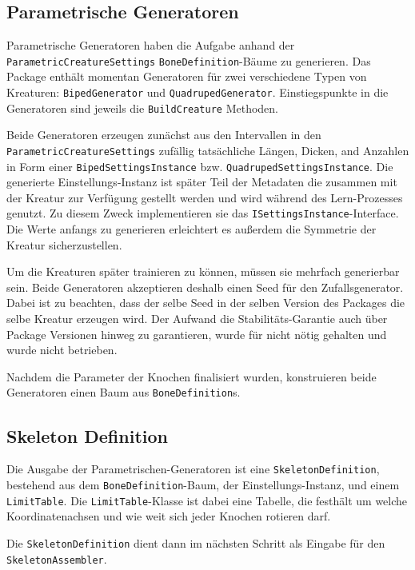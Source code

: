 \subsection{Parametrische Generatoren}
Parametrische Generatoren haben die Aufgabe anhand der \texttt{Parametric\-Creature\-Settings} \texttt{Bone\-Definition}-Bäume zu generieren.
Das Package enthält momentan Generatoren für zwei verschiedene Typen von Kreaturen: \texttt{BipedGenerator} und \texttt{QuadrupedGenerator}.
Einstiegspunkte in die Generatoren sind jeweils die \texttt{BuildCreature} Methoden.

Beide Generatoren erzeugen zunächst aus den Intervallen in den \texttt{Parametric\-Creature\-Settings} zufällig tatsächliche Längen, Dicken, and Anzahlen in Form einer \texttt{Biped\-Settings\-Instance} bzw. \texttt{Quadruped\-Settings\-Instance}.
Die generierte Einstellungs\--Instanz ist später Teil der Metadaten die zusammen mit der Kreatur zur Verfügung gestellt werden und wird während des Lern-Prozesses genutzt.
Zu diesem Zweck implementieren sie das \texttt{ISettings\-Instance}-Interface.
Die Werte anfangs zu generieren erleichtert es außerdem die Symmetrie der Kreatur sicherzustellen.

Um die Kreaturen später trainieren zu können, müssen sie mehrfach generierbar sein.
Beide Generatoren akzeptieren deshalb einen Seed für den Zufallsgenerator. Dabei ist zu beachten, dass der selbe Seed in der selben Version des Packages die selbe Kreatur erzeugen wird. Der Aufwand die Stabilitäts-Garantie auch über Package Versionen hinweg zu garantieren, wurde für nicht nötig gehalten und wurde nicht betrieben.

Nachdem die Parameter der Knochen finalisiert wurden, konstruieren beide Generatoren einen Baum aus \texttt{BoneDefinition}s.

\subsection{Skeleton Definition}
Die Ausgabe der Parametrischen-Generatoren ist eine \texttt{Skeleton\-Definition}, bestehend aus dem \texttt{Bone\-Definition}-Baum, der Einstellungs-Instanz, und einem \texttt{Limit\-Table}.
Die \texttt{LimitTable}-Klasse ist dabei eine Tabelle, die festhält um welche Koordinatenachsen und wie weit sich jeder Knochen rotieren darf.

Die \texttt{Skeleton\-Definition} dient dann im nächsten Schritt als Eingabe für den \texttt{Skeleton\-Assembler}.

